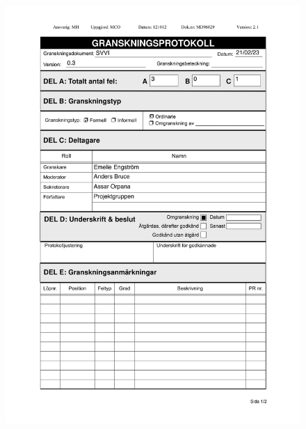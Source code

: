 \documentclass{article}
\begin{document}
 
  \begin{figure}
     \centering
     \includegraphics[width=13cm]{images/SVVI - Granskningsprotokoll-1}
     \renewcommand\figurename{Figure}
     \label{fig:my_label}
 \end{figure}
 
\end{document}
